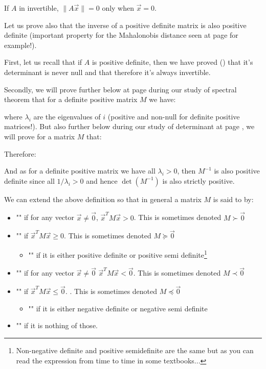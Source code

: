 \begin{enumerate}
		If $A$ in invertible, $\|A\vec{x}\|=0$ only when $\vec{x}=0$.
		
		\label{inverse definite positive matrix is also definite positive} Let us prove also that the inverse of a positive definite matrix is also positive definite (important property for the Mahalonobis distance seen at page \pageref{Mahalanobis distance} for example!).

		First, let us recall that if $A$ is positive definite, then we have proved () that it's determinant is never null and that therefore it's always invertible. 
		
		Secondly, we will prove further below at page \pageref{spectral theorem} during our study of spectral theorem that for a definite positive matrix $M$ we have:
		
		where $\lambda_i$ are the eigenvalues of $i$ (positive and non-null for definite positive matrices!). But also further below during our study of determinant at page \pageref{inverse determinant}, we will prove for a matrix $M$ that:
		
		Therefore:
		
		And as for a definite positive matrix we have all $\lambda_i>0$, then $M^{-1}$ is also positive definite since all $1/\lambda_i>0$ and hence $\det(M^{-1})$ is also strictly positive.
		
		We can extend the above definition so that in general a matrix $M$ is said to by:
		\begin{itemize}
			\item "" if for any vector $\vec{x}\neq\vec{0}$, $\vec{x}^TM\vec{x}>0$. This is sometimes denoted $M\succ \vec{0}$
			\item "" if $\vec{x}^TM\vec{x}\geq 0$. This is sometimes denoted $M\succeq \vec{0}$
			\begin{itemize}
			\item "" if it is either positive definite or positive semi definite\footnote{Non-negative definite and positive semidefinite are the same but as you can read the expression from time to time in some textbooks...}
			\end{itemize}
			
			\item "" if for any vector $\vec{x}\neq\vec{0}$ $\vec{x}^TM\vec{x}<\vec{0}$. This is sometimes denoted $M\prec \vec{0}$
			\item "" if $\vec{x}^TM\vec{x}\leq\vec{0}$. . This is sometimes denoted $M\preceq \vec{0}$
			\begin{itemize}
				\item "" if it is either negative definite or negative semi definite
			\end{itemize}
			\item "" if it is nothing of those.
		\end{itemize}
		

\end{enumerate}
